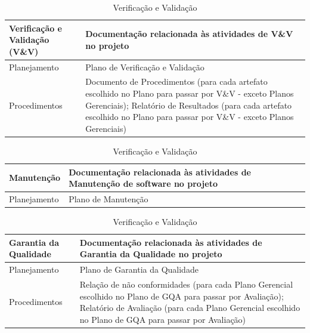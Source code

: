  

\begin{table}[H]
      \begin{center}
        \begin{tabular}{| l | p{6cm} |}
        \hline
        \textbf{Verificação e Validação (V\&V)} & \textbf{Documentação relacionada às atividades de V\&V no projeto} \\ \hline
        Planejamento & Plano de Verificação e Validação \\ \hline
        Procedimentos & Documento de Procedimentos (para cada artefato escolhido no Plano para passar por V\&V - exceto Planos Gerenciais); Relatório de Resultados (para cada artefato escolhido no Plano para passar por V\&V - exceto Planos Gerenciais) \\ \hline
        \end{tabular}
      \end{center}
    \caption{Verificação e Validação}
    \end{table}


    \begin{table}[H]
      \begin{center}
        \begin{tabular}{| l | p{6cm} |}
        \hline
        \textbf{Manutenção} & \textbf{Documentação relacionada às atividades de Manutenção de software no projeto} \\ \hline
        Planejamento & Plano de Manutenção \\ \hline
        \end{tabular}
      \end{center}
    \caption{Verificação e Validação}
    \end{table}

    \begin{table}[H]
      \begin{center}
        \begin{tabular}{| l | p{6cm} |}
        \hline
        \textbf{Garantia da Qualidade} & \textbf{Documentação relacionada às atividades de Garantia da Qualidade no projeto} \\ \hline
        Planejamento & Plano de Garantia da Qualidade \\ \hline
        Procedimentos & Relação de não conformidades (para cada Plano Gerencial escolhido no Plano de GQA para passar por Avaliação); Relatório de Avaliação (para cada Plano Gerencial escolhido no Plano de GQA para passar por Avaliação) \\ \hline
        \end{tabular}
      \end{center}
    \caption{Verificação e Validação}
    \end{table}


